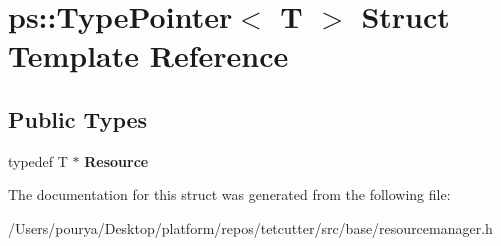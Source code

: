 \hypertarget{structps_1_1TypePointer}{}\section{ps\+:\+:Type\+Pointer$<$ T $>$ Struct Template Reference}
\label{structps_1_1TypePointer}
\subsection*{Public Types}
\begin{DoxyCompactItemize}
\item 
\hypertarget{structps_1_1TypePointer_aa119db5b38f5c3da204800b750857876}{}typedef T $\ast$ {\bfseries Resource}\label{structps_1_1TypePointer_aa119db5b38f5c3da204800b750857876}

\end{DoxyCompactItemize}


The documentation for this struct was generated from the following file\+:\begin{DoxyCompactItemize}
\item 
/\+Users/pourya/\+Desktop/platform/repos/tetcutter/src/base/resourcemanager.\+h\end{DoxyCompactItemize}

